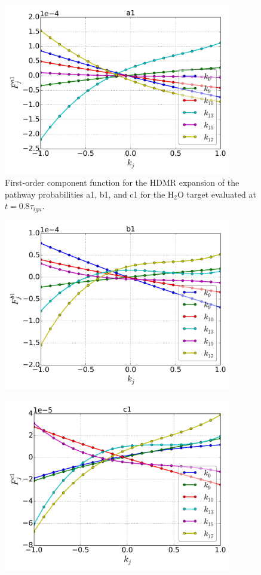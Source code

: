 \begin{figure}[htbp]
	\caption[1$^{st}$ component function of the pathway probabilities a1, b1, and c1]{First-order component function for the HDMR expansion
of the pathway probabilities a1, b1, and c1 for the H$_2$O target
evaluated at $t=0.8\tau_{ign}$.}
    \begin{center}
	\includegraphics[width=100mm]{figs/chapter3/fig15_a.png}
    \end{center}
\label{ch3:fig15}
\end{figure}
\begin{figure}[htbp]
    \begin{center}
	\includegraphics[width=100mm]{figs/chapter3/fig15_b.png}
    \end{center}
\end{figure}
\begin{figure}[htbp]
    \begin{center}
	\includegraphics[width=100mm]{figs/chapter3/fig15_c.png}
    \end{center}
\end{figure}
